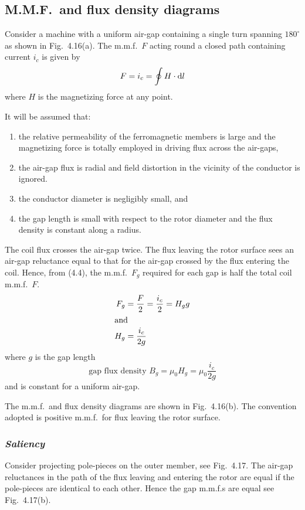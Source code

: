 \documentclass[a4paper,numbers=noenddot,12pt]{scrbook}
\begin{document}
\subsection{M.M.F.\ and flux density diagrams}
Consider a machine with a uniform air-gap containing a single turn spanning $180^{\circ}$ as shown in Fig.\ 4.16(a). The m.m.f.\ $F$ acting round a closed path containing current $i_c$ is given by
\begin{equation}
    F = i_c = \oint H \cdot \dif l
    \label{eq:Eq4.4}
\end{equation}
where $H$ is the magnetizing force at any point.

It will be assumed that:
\begin{enumerate}
    \item the relative permeability of the ferromagnetic members is large and the magnetizing force is totally employed in driving flux across the air-gaps,
    \item the air-gap flux is radial and field distortion in the vicinity of the conductor is ignored.
    \item the conductor diameter is negligibly small, and
    \item the gap length is small with respect to the rotor diameter and the flux density is constant along a radius.
\end{enumerate}
The coil flux crosses the air-gap twice. The flux leaving the rotor surface sees an air-gap reluctance equal to that for the air-gap crossed by the flux entering the coil. Hence, from (4.4), the m.m.f.\ $F_g$ required for each gap is half the total coil m.m.f.\ $F$.
\begin{align*}
    F_g & = \dfrac{F}{2} = \dfrac{i_c}{2} = H_g g \\
    \intertext{and}
    H_g & = \dfrac{i_c}{2g}
\end{align*}
where $g$ is the gap length
\begin{equation}
    \text{gap flux density } B_g = \mu_0 H_g = \mu_0 \dfrac{i_c}{2g}
    \label{eq:Eq4.5}
\end{equation}
and is constant for a uniform air-gap. 

The m.m.f.\ and flux density diagrams are shown in Fig.\ 4.16(b). The convention adopted is positive m.m.f.\ for flux leaving the rotor surface. 

\subsubsection{\textit{Saliency}}
Consider projecting pole-pieces on the outer member, see Fig.\ 4.17. The air-gap reluctances in the path of the flux leaving and entering the rotor are equal if the pole-pieces are identical to each other. Hence the gap m.m.f.s are equal see Fig.\ 4.17(b).
\end{document}
